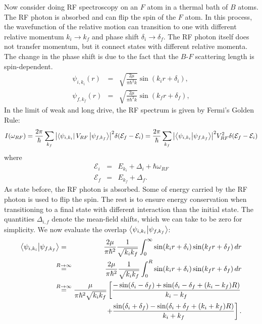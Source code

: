 \documentclass{article}
\theoremstyle{definition}
\newcommand{\f}[2]{\frac{#1}{#2}}
\begin{document}
\noindent  Now consider doing RF spectroscopy on an $F$ atom in a thermal bath of $B$ atoms. The RF photon is absorbed and can flip the spin of the $F$ atom. In this process, the wavefunction of the relative motion can transition to one with different relative momentum $k_i \to k_f$ and phase shift $\delta_i \to \delta_f$. The RF photon itself does not transfer momentum, but it connect states with different relative momenta. The change in the phase shift is due to the fact that the $B$-$F$ scattering length is spin-dependent. 
\begin{eqnarray}\label{eq:wfns}
\psi_{i,k_i}(r) &=&  \sqrt{\frac{2\mu}{\pi \hbar^2 k}} \sin(k_ir + \delta_i),\\
\psi_{f,k_f}(r) &=&  \sqrt{\frac{2\mu}{\pi \hbar^2 k}} \sin(k_fr + \delta_f),
\end{eqnarray}
In the limit of weak and long drive, the RF spectrum is given by Fermi's Golden Rule:
\begin{equation}\label{eq:FGR}
I(\omega_{RF}) = \f{2\pi}{\hbar} \sum_{k_f} \abs{\bra{\psi_{i,k_i}}  V_{RF}  \ket{\psi_{f,k_f}}}^2  \delta(\mathcal{E}_f - \mathcal{E}_i) = \f{2\pi}{\hbar} \sum_{k_f} \abs{\bra{\psi_{i,k_i}}   \ket{\psi_{f,k_f}}}^2 V_{RF}^2  \delta(\mathcal{E}_f - \mathcal{E}_i) 
\end{equation}
where 
\begin{eqnarray}\label{eq:energies}
\mathcal{E}_{i} &=& E_{k_i} + \Delta_i + \hbar \omega_{RF}\\
\mathcal{E}_{f} &=& E_{k_f} + \Delta_f.
\end{eqnarray}
As state before, the RF photon is absorbed. Some of energy carried by the RF photon is used to flip the spin. The rest is to ensure energy conservation when transitioning to a final state with different interaction than the initial state. The quantities $\Delta_{i,f}$ denote the mean-field shifts, which we can take to be zero for simplicity. We now evaluate the overlap $\bra{\psi_{i,k_i}} \ket{\psi_{f,k_f}}$:
\begin{eqnarray}
\bra{\psi_{i,k_i}} \ket{\psi_{f,k_f}} 
&=& \f{2\mu}{\pi \hbar^2} \f{1}{\sqrt{k_ik_f}} \int_0^\infty  \sin(k_ir + \delta_i) \sin(k_f r + \delta_f) \,dr \\ 
&\stackrel{\mathclap{\normalfont{R\to \infty}}}{=}& 
\f{2\mu}{\pi \hbar^2} \f{1}{\sqrt{k_ik_f}} \int_0^R  \sin(k_ir + \delta_i) \sin(k_f r + \delta_f) \,dr \\ 
&\stackrel{\mathclap{\normalfont{R\to \infty}}}{=}&  
\f{\mu}{\pi \hbar^2 \sqrt{k_ik_f}} 
\left[ \f{-\sin(\delta_i - \delta_f) + \sin(\delta_i - \delta_f + (k_i - k_f)R)}{k_i - k_f} \right. \nonumber \\
&&\qquad \qquad \left.+ \f{\sin(\delta_i + \delta_f) - \sin(\delta_i + \delta_f + (k_i + k_f)R)}{k_i + k_f} \right].
\end{eqnarray}
\end{document}
